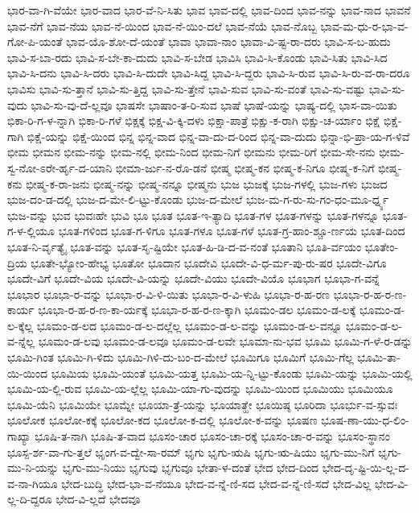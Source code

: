 {ಭಾರ-ವಾ-ಗಿ-ವೆಯೇ
ಭಾರ-ವಾದ
ಭಾರ-ವೆ-ನಿ-ಸಿತು
ಭಾವ
ಭಾವ-ದಲ್ಲಿ
ಭಾವ-ದಿಂದ
ಭಾವ-ನನ್ನು
ಭಾವ-ನಾದ
ಭಾವನೆ
ಭಾವ-ನೆಗೆ
ಭಾವ-ನೆಯ
ಭಾವ-ನೆ-ಯಿಂದ
ಭಾವ-ನೆ-ಯಿಂ-ದಲೆ
ಭಾವ-ನೆಯೆ
ಭಾವ-ನೊಬ್ಬ
ಭಾವ-ಮ-ಧು-ರ-ಭಾ-ವ-ಗೋ-ಪಿ-ಯಂತೆ
ಭಾವ-ಯೊ-ಶೋ-ದೆ-ಯಂತೆ
ಭಾವಾ
ಭಾವಾ-ನಾಂ
ಭಾವಾ-ವಿ-ಷ್ಟ-ರಾ-ದರು
ಭಾವಿ-ಸ-ಬ-ಹುದು
ಭಾವಿ-ಸ-ಬಾ-ರದು
ಭಾವಿ-ಸ-ಬೇ-ಕಾ-ದುದು
ಭಾವಿ-ಸ-ಬೇಡ
ಭಾವಿಸಿ
ಭಾವಿ-ಸಿ-ಕೊಂಡು
ಭಾವಿ-ಸಿತು
ಭಾವಿ-ಸಿದ
ಭಾವಿ-ಸಿ-ದನು
ಭಾವಿ-ಸಿ-ದರು
ಭಾವಿ-ಸಿ-ದುದೇ
ಭಾವಿ-ಸಿದ್ದ
ಭಾವಿ-ಸಿ-ದ್ದರು
ಭಾವಿ-ಸಿ-ರುವ
ಭಾವಿ-ಸಿ-ರು-ವ-ರಾ-ದರೂ
ಭಾವಿಸು
ಭಾವಿ-ಸು-ತ್ತಾನೆ
ಭಾವಿ-ಸು-ತ್ತಿದ್ದ
ಭಾವಿ-ಸು-ತ್ತೇನೆ
ಭಾವಿ-ಸುವ
ಭಾವಿ-ಸು-ವಂತೆ
ಭಾವಿ-ಸು-ವಷ್ಟು
ಭಾವಿ-ಸು-ವುದು
ಭಾವಿ-ಸು-ವು-ದೆ-ಲ್ಲವೂ
ಭಾಷಸೇ
ಭಾಷಾಂ-ತ-ರಿ-ಸುವ
ಭಾಷೆ
ಭಾಷೆ-ಯನ್ನು
ಭಾಷ್ಯ-ದಲ್ಲಿ
ಭಾಸ-ವಾ-ಯಿತು
ಭಿಕಾ-ರಿ-ಗ-ಳ-ನ್ನಾಗಿ
ಭಿಕಾ-ರಿ-ಗಳೆ
ಭಿಕ್ಷಕ್ಕೆ
ಭಿಕ್ಷ-ವಿ-ಕ್ಕಿ-ದಳು
ಭಿಕ್ಷಾ-ಪಾತ್ರೆ
ಭಿಕ್ಷು-ಕ-ರಾಗಿ
ಭಿಕ್ಷು-ಚ-ರ್ಯಾಂ
ಭಿಕ್ಷೆ
ಭಿಕ್ಷೆ-ಗಾಗಿ
ಭಿಕ್ಷೆ-ಯನ್ನು
ಭಿಕ್ಷೆ-ಯಿಂದ
ಭಿನ್ನ
ಭಿನ್ನ-ವಾದ
ಭಿನ್ನ-ವಾ-ದು-ದ-ರಿಂದ
ಭಿನ್ನ-ವಾ-ದುದು
ಭಿನ್ನಾ-ಭಿ-ಪ್ರಾ-ಯ-ಗ-ಳಿವೆ
ಭೀಮ
ಭೀಮನ
ಭೀಮ-ನನ್ನು
ಭೀಮ-ನಲ್ಲಿ
ಭೀಮ-ನಿಂದ
ಭೀಮ-ನಿಗೆ
ಭೀಮನು
ಭೀಮ-ರಿಗೆ
ಭೀಮ-ಸೇ-ನನು
ಭೀಮ-ಸ್ವ-ನೋ-ಽರೇ-ರ್ಹೃ-ದ-ಯಾನಿ
ಭೀಮಾ-ರ್ಜು-ನ-ರೊ-ಡನೆ
ಭೀಷ್ಮ
ಭೀಷ್ಮ-ಕನ
ಭೀಷ್ಮ-ಕ-ನಿಗೂ
ಭೀಷ್ಮ-ಕ-ನಿಗೆ
ಭೀಷ್ಮ-ಕನು
ಭೀಷ್ಮ-ಕ-ರಾ-ಜನು
ಭೀಷ್ಮ-ನನ್ನು
ಭೀಷ್ಮ-ನನ್ನೂ
ಭೀಷ್ಮನು
ಭುಜ
ಭುಜಕ್ಕೆ
ಭುಜ-ಗಳಲ್ಲಿ
ಭುಜ-ಗಳು
ಭುಜದ
ಭುಜ-ದಂ-ಡ-ದಲ್ಲಿ
ಭುಜ-ದ-ಮೇ-ಲಿ-ಟ್ಟು-ಕೊಂಡು
ಭುಜ-ದ-ಮೇಲೆ
ಭುಜ-ಮ-ಗ-ರು-ಸು-ಗಂ-ಧಂ-ಮೂ-ರ್ಧ್ನ್ಯ
ಭುಜ-ವನ್ನು
ಭುವ
ಭುವಃಹೇ
ಭುವಿ
ಭೂ
ಭೂತ
ಭೂತ-ಇ-ತ್ಯಾದಿ
ಭೂತ-ಗಳ
ಭೂತ-ಗಳನ್ನು
ಭೂತ-ಗಳನ್ನೂ
ಭೂತ-ಗ-ಳ-ಲ್ಲಿಯೂ
ಭೂತ-ಗಳಿಂದ
ಭೂತ-ಗ-ಳಿಗೂ
ಭೂತ-ಗಳೂ
ಭೂತ-ಗಳೆ
ಭೂತ-ಗ್ರ-ಹಾಂ-ಶ್ಚೂ-ರ್ಣಯ
ಭೂತ-ದಿಂದ
ಭೂತ-ನಿ-ರ್ವೃತ್ಯೈ
ಭೂತ-ವನ್ನು
ಭೂತ-ಸೃ-ಷ್ಟಿಯೇ
ಭೂತ-ಹಿ-ಡಿ-ದ-ವ-ನಂತೆ
ಭೂತಾನಿ
ಭೂತಿ-ರ್ವಯಂ
ಭೂತೇಂ-ದ್ರಿಯ
ಭೂತೇ-ಭ್ಯೋಂ-ಹೇಭ್ಯ
ಭೂತೋ
ಭೂದಾನ
ಭೂದೇವಿ
ಭೂದೇ-ವಿ-ಧ-ರ್ಮ-ಪು-ರು-ಷರ
ಭೂದೇ-ವಿಗೂ
ಭೂದೇ-ವಿಗೆ
ಭೂದೇ-ವಿಯ
ಭೂದೇ-ವಿ-ಯನ್ನು
ಭೂದೇ-ವಿಯು
ಭೂದೇ-ವಿಯೊ
ಭೂಭಾಗ
ಭೂಭಾ-ಗ-ವನ್ನೆ
ಭೂಭಾರ
ಭೂಭಾ-ರ-ವನ್ನು
ಭೂಭಾ-ರ-ವಿ-ಳಿ-ಯಿತು
ಭೂಭಾ-ರ-ವಿ-ಳುಹಿ
ಭೂಭಾ-ರ-ಹ-ರಣ
ಭೂಭಾ-ರ-ಹ-ರ-ಣ-ಕಾರ್ಯ
ಭೂಭಾ-ರ-ಹ-ರ-ಣ-ಕಾ-ರ್ಯಕ್ಕೆ
ಭೂಭಾ-ರ-ಹ-ರ-ಣ-ಕ್ಕಾಗಿ
ಭೂಮಂ-ಡಲ
ಭೂಮಂ-ಡ-ಲಕ್ಕೆ
ಭೂಮಂ-ಡ-ಲ-ಕ್ಕೆಲ್ಲ
ಭೂಮಂ-ಡ-ಲದ
ಭೂಮಂ-ಡ-ಲ-ದಲ್ಲೆಲ್ಲ
ಭೂಮಂ-ಡ-ಲ-ವನ್ನು
ಭೂಮಂ-ಡ-ಲ-ವನ್ನೂ
ಭೂಮಂ-ಡ-ಲ-ವ-ನ್ನೆಲ್ಲ
ಭೂಮಂ-ಡ-ಲವು
ಭೂಮಂ-ಡ-ಲವೂ
ಭೂಮಂ-ಡ-ಲವೇ
ಭೂಮಾ-ನು-ಭವ
ಭೂಮಿ
ಭೂಮಿ-ಗ-ಳೆ-ರ-ಡನ್ನು
ಭೂಮಿ-ಗಿಂತ
ಭೂಮಿ-ಗಿ-ಳಿದು
ಭೂಮಿ-ಗಿಳಿ-ದು-ಬಂ-ದ-ಮೇಲೆ
ಭೂಮಿಗೂ
ಭೂಮಿಗೆ
ಭೂಮಿ-ಗೆಲ್ಲ
ಭೂಮಿ-ತಾ-ಯಿ-ಯಿಂದ
ಭೂಮಿಯ
ಭೂಮಿ-ಯಂತೆ
ಭೂಮಿ-ಯತ್ತ
ಭೂಮಿ-ಯ-ನ್ನಿ-ಟ್ಟು-ಕೊಂಡು
ಭೂಮಿ-ಯನ್ನು
ಭೂಮಿ-ಯಲ್ಲಿ
ಭೂಮಿ-ಯ-ಲ್ಲಿ-ರುವ
ಭೂಮಿ-ಯ-ಲ್ಲೆಲ್ಲ
ಭೂಮಿ-ಯಾ-ಗು-ವುದನ್ನು
ಭೂಮಿ-ಯಿಂದ
ಭೂಮಿಯು
ಭೂಮಿಯೂ
ಭೂಮಿ-ಯೆನಿ
ಭೂಮಿಯೇ
ಭೂಮ್ನೇ
ಭೂಯಾ-ತ್ರೆ-ಯನ್ನು
ಭೂಯಾತ್ಹೇ
ಭೂಯಿಷ್ಠ
ಭೂರಿದಾ
ಭೂರ್ಭು-ವ-ಸ್ಸುವಃ
ಭೂಲೋಕ
ಭೂಲೋ-ಕಕ್ಕೆ
ಭೂಲೋ-ಕದ
ಭೂಲೋ-ಕ-ದಲ್ಲಿ
ಭೂಲೋ-ಕ-ವನ್ನು
ಭೂಷಣ
ಭೂಷ-ಣಾ-ಯು-ಧ-ಲಿಂ-ಗಾಖ್ಯಾ
ಭೂಷಿ-ತ-ನಾಗಿ
ಭೂಷಿ-ತ-ವಾದ
ಭೂಸಂ-ಚಾರ
ಭೂಸಂ-ಚಾ-ರಕ್ಕೆ
ಭೂಸಂ-ಚಾ-ರ-ವನ್ನು
ಭೂಸಂ-ಸ್ಥಾನಂ
ಭೂಸ್ಪ-ರ್ಶ-ವಾ-ಗು-ತ್ತಲೆ
ಭೃಂಗ-ವ-ದ್ವೇ-ಸಾ-ರಮ್
ಭೃಗು
ಭೃಗು-ಋಷಿ
ಭೃಗು-ಋ-ಷಿಯು
ಭೃಗು-ಮು-ನಿಗೆ
ಭೃಗು-ಮು-ನಿ-ಯನ್ನು
ಭೃಗು-ಮು-ನಿಯು
ಭೃಗುವು
ಭೃಗುವೂ
ಭೇತಾ-ಳ-ದಂತೆ
ಭೇದ
ಭೇದ-ದಿಂದ
ಭೇದ-ದೃ-ಷ್ಟಿ-ಯಿ-ಲ್ಲ-ದ-ವ-ನಾ-ಗಿಯೂ
ಭೇದ-ಬುದ್ಧಿ
ಭೇದ-ಭಾ-ವ-ನೆಯೂ
ಭೇದ-ವ-ನ್ನೆ-ಣಿ-ಸದ
ಭೇದ-ವ-ನ್ನೆ-ಣಿ-ಸದೆ
ಭೇದ-ವಿಲ್ಲ
ಭೇದ-ವಿ-ಲ್ಲ-ದಿ-ದ್ದರೂ
ಭೇದ-ವಿ-ಲ್ಲದೆ
ಭೇದವೂ
}
